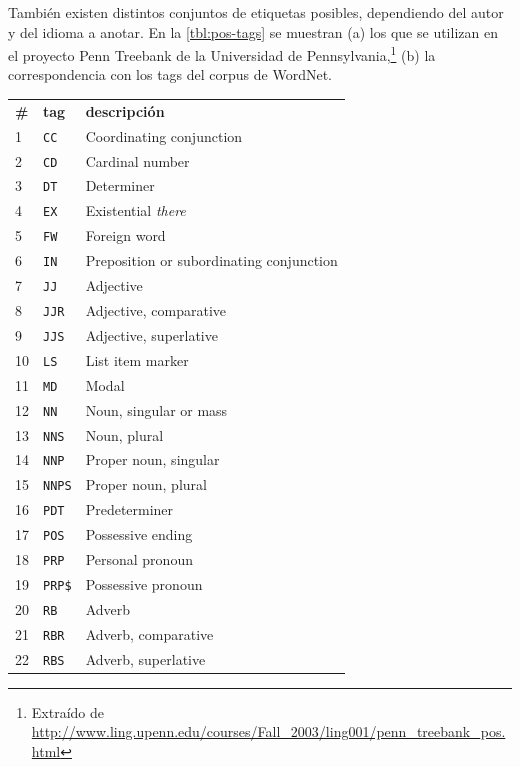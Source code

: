 También existen distintos conjuntos de etiquetas posibles, dependiendo del autor y del idioma a anotar. En la \autoref{tbl:pos-tags} se muestran (a) los que se utilizan en el proyecto Penn Treebank de la Universidad de Pennsylvania,\footnote{Extraído de \url{http://www.ling.upenn.edu/courses/Fall_2003/ling001/penn_treebank_pos.html}} (b) la correspondencia con los tags del corpus de WordNet.

\begin{table}[htbp]
\centering
\begin{subtable}[t]{0.60\linewidth}
\centering
\begin{tabular}{|l|l|l|}
\hline
\textbf{\#} & \textbf{tag} & \textbf{descripción} \\ \hhline{===}
1 & \verb=CC= & Coordinating conjunction \\ \hline
2 & \verb=CD= & Cardinal number \\ \hline
3 & \verb=DT= & Determiner \\ \hline
4 & \verb=EX= & Existential \emph{there} \\ \hline
5 & \verb=FW= & Foreign word \\ \hline
6 & \verb=IN= & Preposition or subordinating conjunction \\ \hline
7 & \verb=JJ= & Adjective \\ \hline
8 & \verb=JJR= & Adjective, comparative \\ \hline
9 & \verb=JJS= & Adjective, superlative \\ \hline
10 & \verb=LS= & List item marker \\ \hline
11 & \verb=MD= & Modal \\ \hline
12 & \verb=NN= & Noun, singular or mass \\ \hline
13 & \verb=NNS= & Noun, plural \\ \hline
14 & \verb=NNP= & Proper noun, singular \\ \hline
15 & \verb=NNPS= & Proper noun, plural \\ \hline
16 & \verb=PDT= & Predeterminer \\ \hline
17 & \verb=POS= & Possessive ending \\ \hline
18 & \verb=PRP= & Personal pronoun \\ \hline
19 & \verb=PRP$= & Possessive pronoun \\ \hline
20 & \verb=RB= & Adverb \\ \hline
21 & \verb=RBR= & Adverb, comparative \\ \hline
22 & \verb=RBS= & Adverb, superlative \\ \hline

\end{tabular}
\end{subtable}
\end{table}
